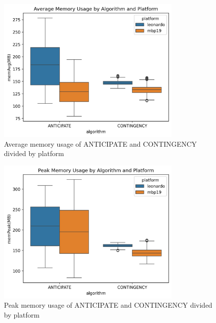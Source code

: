 \documentclass[a4paper,singleside,12pt]{report} %
\begin{document}

\begin{figure}[h!]
    \centering
    \includegraphics[width=0.8\textwidth]{imgs/avg_mem_usage.png}
    \caption{Average memory usage of ANTICIPATE and CONTINGENCY divided by platform}
    \label{fig:ant_cont_avg_mem_usage}
\end{figure}

\begin{figure}[h!]
    \centering
    \includegraphics[width=0.8\textwidth]{imgs/peak_mem_usage.png}
    \caption{Peak memory usage of ANTICIPATE and CONTINGENCY divided by platform}
    \label{fig:ant_cont_peak_mem_usage}
\end{figure}
\end{document}
